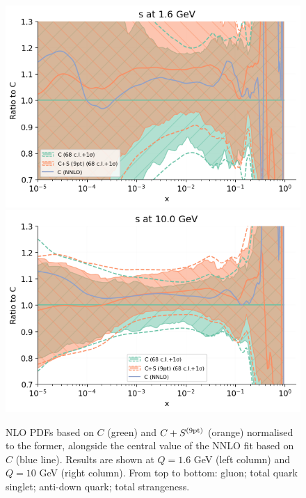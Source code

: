 \begin{figure}[H]
\begin{center}
    \includegraphics[scale=0.45]{mhous/plots/jplots/pdfscalespecs0_basespecs0_pdfnormalize0_plot_pdfs_s.png}
       \includegraphics[scale=0.45]{mhous/plots/jplots/pdfscalespecs0_basespecs0_pdfnormalize0_plot_pdfs_s2.png}

   \caption{\small NLO PDFs based on $C$ (green) and $C+S^{\rm (9pt)}$ (orange) normalised
     to the former, alongside the central value of the NNLO fit based on $C$ (blue line).
     Results are shown at $Q=1.6$ GeV (left column) and $Q=10$ GeV (right column). From top to bottom: gluon; total quark singlet;
     anti-down quark; total strangeness.
    \label{fig:Global-NLO-CovMatTH} }
  \end{center}
\end{figure}
